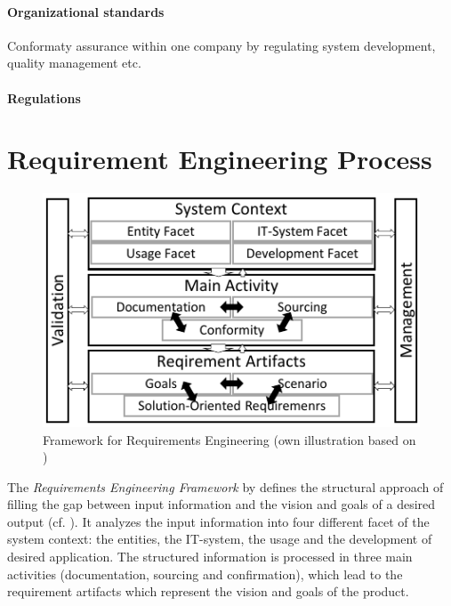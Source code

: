 \paragraph*{Organizational standards} Conformaty assurance within one company by regulating system development, quality management etc. \parencite[28]{Kotonya.2000}
\paragraph*{Regulations}
\section{Requirement Engineering Process} 
\begin{figure}[H]
    \centering
    \includegraphics[scale=1.5]{img/ReqAnFrameWork.pdf}
    \caption[Framework for Requirements Engineering]{Framework for Requirements Engineering (own illustration based on \cite[41]{Pohl.2007})}
    \label{fig:reqFramework}
\end{figure}
The \textit{Requirements Engineering Framework} by \textcite{Pohl.2007} defines the structural approach of filling the gap between input information and the vision and goals of a desired output (cf. ). It analyzes the input information into four different facet of the system context: the entities, the IT-system, the usage and the development of desired application. The structured information is processed in three main activities (documentation, sourcing and confirmation), which lead to the requirement artifacts which represent the vision and goals of the product. \parencite[][38-39]{Pohl.2007}
